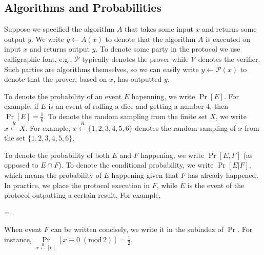 \documentclass[../lecture-notes-148x210.tex]{subfiles}
\begin{document}
\subsection*{Algorithms and Probabilities}

Suppose we specified the algorithm $A$ that takes some input $x$ and returns
some output $y$. We write $y \gets A(x)$ to denote that the algorithm $A$ is
executed on input $x$ and returns output $y$. To denote some party in the 
protocol we use calligraphic font, e.g., $\mathcal{P}$ typically denotes 
the prover while $\mathcal{V}$ denotes the verifier. Such parties are algorithms 
themselves, so we can easily write $y \gets \mathcal{P}(x)$ to denote that 
the prover, based on $x$, has outputted $y$.

To denote the probability of an event $E$ hapenning, we write $\Pr[E]$. For
example, if $E$ is an event of rolling a dice and getting a number $4$, then
$\Pr[E] = \frac{1}{6}$. To denote the random sampling from the finite set $X$,
we write $x \xleftarrow{R} X$. For example, $x \xleftarrow{R} \{1,2,3,4,5,6\}$
denotes the random sampling of $x$ from the set $\{1,2,3,4,5,6\}$.

To denote the probability of both $E$ and $F$ happening, we write $\Pr[E,F]$ (as
opposed to $E \cap F$). To denote the conditional probability, we write
$\Pr[E|F]$, which means the probability of $E$ happening given that $F$ has
already happened. In practice, we place the protocol execution in $F$, while $E$
is the event of the protocol outputting a certain result. For example,
\begin{xequation}
    \Pr{} = .
\end{xequation}

When event $F$ can be written concisely, we write it in the subindex of $\Pr$.
For instance, $\underset{x \xleftarrow{R} [6]}{\Pr}[x \equiv 0 \; (\text{mod}\,2)]=\frac{1}{2}$.
\end{document}
